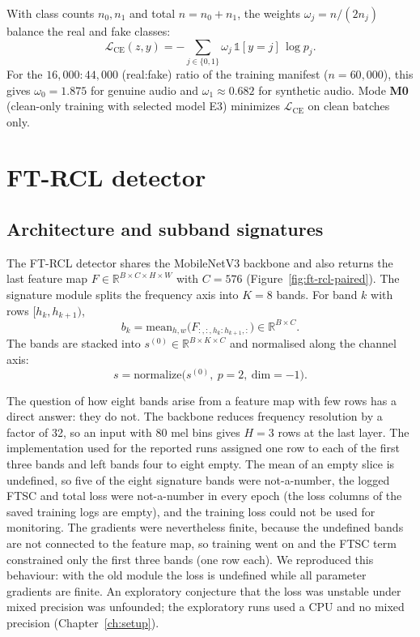 With class counts $n_0, n_1$ and total $n = n_0 + n_1$, the weights $\omega_j = n / (2 n_j)$ balance the real and fake classes:
\begin{equation}
\mathcal{L}_{\mathrm{CE}}(z, y) = -\sum_{j \in \{0,1\}} \omega_j \,\mathbb{1}[y=j]\,\log p_j .
\label{eq:ce}
\end{equation}
For the $16{,}000:44{,}000$ (real:fake) ratio of the training manifest ($n=60{,}000$), this gives $\omega_0 = 1.875$ for genuine audio and $\omega_1 \approx 0.682$ for synthetic audio. Mode \textbf{M0} (clean-only training with selected model E3) minimizes $\mathcal{L}_{\mathrm{CE}}$ on clean batches only.

\section{FT-RCL detector}
\label{sec:ftrcl}

\subsection{Architecture and subband signatures}

The FT-RCL detector shares the MobileNetV3 backbone and also returns the last feature map $F \in \mathbb{R}^{B \times C \times H \times W}$ with $C=576$ (Figure~\ref{fig:ft-rcl-paired}). The signature module splits the frequency axis into $K=8$ bands. For band $k$ with rows $[h_k, h_{k+1})$,
\begin{equation}
b_k = \mathrm{mean}_{h,w}\big(F_{:,:,h_k:h_{k+1},:}\big) \in \mathbb{R}^{B \times C}.
\label{eq:subband}
\end{equation}
The bands are stacked into $s^{(0)} \in \mathbb{R}^{B \times K \times C}$ and normalised along the channel axis:
\begin{equation}
s = \mathrm{normalize}\big(s^{(0)},\ p=2,\ \mathrm{dim}=-1\big).
\label{eq:signature}
\end{equation}

The question of how eight bands arise from a feature map with few rows has a direct answer: they do not. The backbone reduces frequency resolution by a factor of 32, so an input with 80 mel bins gives $H=3$ rows at the last layer. The implementation used for the reported runs assigned one row to each of the first three bands and left bands four to eight empty. The mean of an empty slice is undefined, so five of the eight signature bands were not-a-number, the logged FTSC and total loss were not-a-number in every epoch (the loss columns of the saved training logs are empty), and the training loss could not be used for monitoring. The gradients were nevertheless finite, because the undefined bands are not connected to the feature map, so training went on and the FTSC term constrained only the first three bands (one row each). We reproduced this behaviour: with the old module the loss is undefined while all parameter gradients are finite. An exploratory conjecture that the loss was unstable under mixed precision was unfounded; the exploratory runs used a CPU and no mixed precision (Chapter~\ref{ch:setup}).

